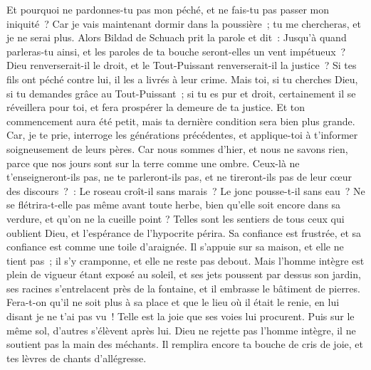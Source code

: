 \begin{multicols}{2}
Et pourquoi ne pardonnes-tu pas mon péché, et ne fais-tu pas passer mon iniquité~? Car je vais maintenant dormir dans la poussière~; tu me chercheras, et je ne serai plus.
\VerseOne{}Alors Bildad de Schuach prit la parole et dit~:
Jusqu'à quand parleras-tu ainsi, et les paroles de ta bouche seront-elles un vent impétueux~?
Dieu renverserait-il le droit, et le Tout-Puissant renverserait-il la justice~?
Si tes fils ont péché contre lui, il les a livrés à leur crime.
Mais toi, si tu cherches Dieu, si tu demandes grâce au Tout-Puissant~;
si tu es pur et droit, certainement il se réveillera pour toi, et fera prospérer la demeure de ta justice.
Et ton commencement aura été petit, mais ta dernière condition sera bien plus grande.
Car, je te prie, interroge les générations précédentes, et applique-toi à t'informer soigneusement de leurs pères.
Car nous sommes d'hier, et nous ne savons rien, parce que nos jours sont sur la terre comme une ombre.
Ceux-là ne t'enseigneront-ils pas, ne te parleront-ils pas, et ne tireront-ils pas de leur cœur des discours~?~:
Le roseau croît-il sans marais~? Le jonc pousse-t-il sans eau~?
Ne se flétrira-t-elle pas même avant toute herbe, bien qu'elle soit encore dans sa verdure, et qu'on ne la cueille point ?
Telles sont les sentiers de tous ceux qui oublient Dieu, et l'espérance de l'hypocrite périra.
Sa confiance est frustrée, et sa confiance est comme une toile d'araignée.
Il s'appuie sur sa maison, et elle ne tient pas~; il s'y cramponne, et elle ne reste pas debout.
Mais l'homme intègre est plein de vigueur étant exposé au soleil, et ses jets poussent par dessus son jardin,
ses racines s'entrelacent près de la fontaine, et il embrasse le bâtiment de pierres.
Fera-t-on qu'il ne soit plus à sa place et que le lieu où il était le renie, en lui disant je ne t'ai pas vu~!
Telle est la joie que ses voies lui procurent. Puis sur le même sol, d'autres s'élèvent après lui.
Dieu ne rejette pas l'homme intègre, il ne soutient pas la main des méchants.
Il remplira encore ta bouche de cris de joie, et tes lèvres de chants d'allégresse.

\end{multicols}

